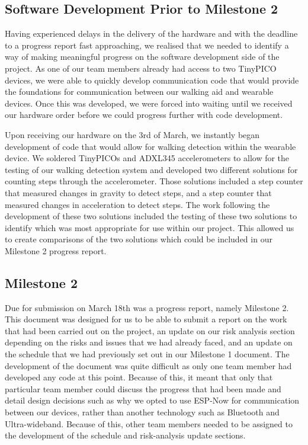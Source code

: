         \subsection{Software Development Prior to Milestone 2}

            Having experienced delays in the delivery of the hardware and with the deadline to a progress report fast approaching, we realised that we needed to identify a way of making meaningful progress on the software development side of the project. As one of our team members already had access to two TinyPICO devices, we were able to quickly develop communication code that would provide the foundations for communication between our walking aid and wearable devices. Once this was developed, we were forced into waiting until we received our hardware order before we could progress further with code development. 

            Upon receiving our hardware on the 3rd of March, we instantly began development of code that would allow for walking detection within the wearable device. We soldered TinyPICOs and ADXL345 accelerometers to allow for the testing of our walking detection system and developed two different solutions for counting steps through the accelerometer. Those solutions included a step counter that measured changes in gravity to detect steps, and a step counter that measured changes in acceleration to detect steps. The work following the development of these two solutions included the testing of these two solutions to identify which was most appropriate for use within our project. This allowed us to create comparisons of the two solutions which could be included in our Milestone 2 progress report.

        \subsection{Milestone 2}

            Due for submission on March 18th was a progress report, namely Milestone 2. This document was designed for us to be able to submit a report on the work that had been carried out on the project, an update on our risk analysis section depending on the risks and issues that we had already faced, and an update on the schedule that we had previously set out in our Milestone 1 document. The development of the document was quite difficult as only one team member had developed any code at this point. Because of this, it meant that only that particular team member could discuss the progress that had been made and detail design decisions such as why we opted to use ESP-Now for communication between our devices, rather than another technology such as Bluetooth and Ultra-wideband. Because of this, other team members needed to be assigned to the development of the schedule and risk-analysis update sections. 

